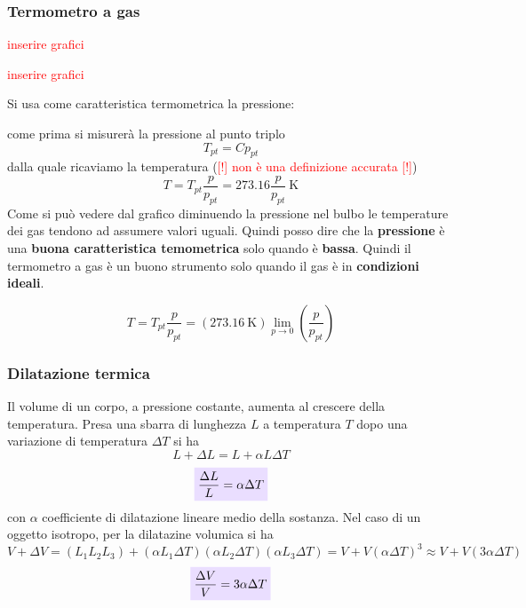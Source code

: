 \documentclass[x11names]{article}
\newcommand{\viola}[1]{\colorbox{yred}{$\displaystyle #1$}}
\begin{document}
	\subsubsection{Termometro a gas}
	\begin{center}
		\begin{minipage}{0.49\textwidth}
			\begin{center}
				\textcolor{red}{inserire grafici}
			\end{center}
		\end{minipage}
		\begin{minipage}{0.49\textwidth}
			\begin{center}
				\textcolor{red}{inserire grafici}
			\end{center}
		\end{minipage}
	\end{center}
	Si usa come caratteristica termometrica la pressione:
	
	come prima si misurerà la pressione al punto triplo
	\[ 
	T_{pt} = Cp_{pt}
	\]
	dalla quale ricaviamo la temperatura (\textcolor{red}{[!] non è una definizione accurata [!]})
	\[ 
	T = T_{pt}\frac{p}{p_{pt}} = 273.16\frac{p}{p_{pt}}\SI{}{\kelvin}
	\]
	Come si può vedere dal grafico diminuendo la pressione nel bulbo le temperature dei gas tendono ad assumere valori uguali. Quindi posso dire che la \textbf{pressione} è una \textbf{buona caratteristica temometrica} solo quando è \textbf{bassa}. Quindi il termometro a gas è un buono strumento solo quando il gas è in \textbf{condizioni ideali}.
	
	\[ 
	T = T_{pt}\frac{p}{p_{pt}} = \left(\SI{273.16}{\kelvin}\right)\lim_{p\to 0}\left(\frac{p}{p_{pt}}\right)
	\]
	
	\subsubsection{Dilatazione termica}
	Il volume di un corpo, a pressione costante, aumenta al crescere della temperatura. Presa una sbarra di lunghezza \(L\) a temperatura \(T\) dopo una variazione di temperatura \(\Delta T\) si ha
	\[ 
	L +\Delta L = L + \alpha L\Delta T
	\]
	\[ 
	\viola{\frac{\Delta L}{L} = \alpha \Delta T}
	\]
	con \(\alpha\) coefficiente di dilatazione lineare medio della sostanza. Nel caso di un oggetto isotropo, per la dilatazine volumica si ha
	\[ 
	V + \Delta V = \left(L_1L_2L_3\right) + \left(\alpha L_1 \Delta T\right)\left(\alpha L_2 \Delta T\right)\left(\alpha L_3 \Delta T\right) = V + V(\alpha \Delta T)^3 \approx V + V(3\alpha \Delta T)
	\]
	\[ 
	\viola{\frac{\Delta V}{V} = 3\alpha \Delta T}
	\]
	
\end{document}
